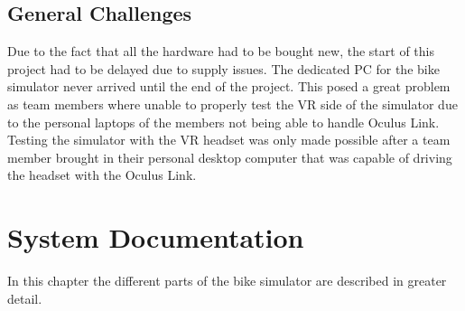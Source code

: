 \documentclass[english,notitlepage,smartquotes]{hgbreport}
\begin{document}
\section{General Challenges}
Due to the fact that all the hardware had to be bought new, the start of this project had to be delayed due to supply issues. 
The dedicated PC for the bike simulator never arrived until the end of the project. This posed a great problem as team members where unable to properly test the VR side of the simulator due to the personal laptops of the members not being able to handle Oculus Link. 
Testing the simulator with the VR headset was only made possible after a team member brought in their personal desktop computer that was capable of driving the headset with the Oculus Link.


\chapter{System Documentation}
In this chapter the different parts of the bike simulator are described in greater detail.
\end{document}

